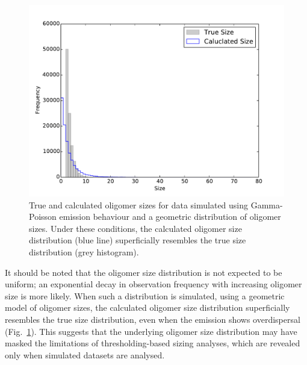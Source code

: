 \begin{figure}
   \begin{center}
      \includegraphics*[clip=true, width=6in]{sizing/True_vs_Measured_oligomer_events_geometric_100000.pdf}
      \caption{True and calculated oligomer sizes for data simulated using Gamma-Poisson emission behaviour and a geometric distribution of oligomer sizes. Under these conditions, the calculated oligomer size distribution (blue line) superficially resembles the true size distribution (grey histogram).}
      \label{fig:gamma_Poisson_size_photons_geometric}
   \end{center}
\end{figure}

It should be noted that the oligomer size distribution is not expected to be uniform; an exponential decay in observation frequency with increasing oligomer size is more likely. When such a distribution is simulated, using a geometric model of oligomer sizes, the calculated oligomer size distribution superficially resembles the true size distribution, even when the emission shows overdispersal (Fig.~\ref{fig:gamma_Poisson_size_photons_geometric}). This suggests that the underlying oligomer size distribution may have masked the limitations of thresholding-based sizing analyses, which are revealed only when simulated datasets are analysed. 

